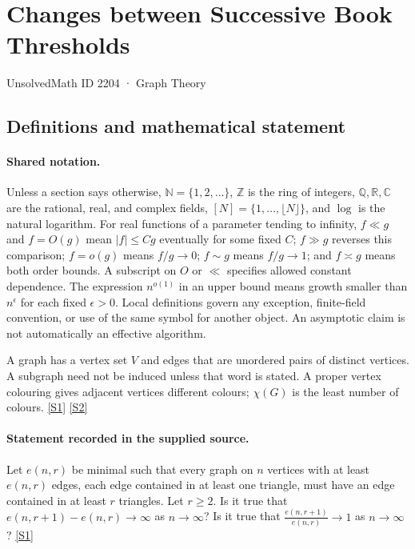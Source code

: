 \documentclass[11pt,a4paper]{article}
\newcommand{\N}{\mathbb{N}}
\newcommand{\Z}{\mathbb{Z}}
\newcommand{\Q}{\mathbb{Q}}
\newcommand{\R}{\mathbb{R}}
\newcommand{\C}{\mathbb{C}}
\newcommand{\sref}[2]{\hyperlink{source:#1:#2}{[S#2]}}
\begin{document}

\setcounter{section}{2203}

\section{Changes between Successive Book Thresholds}\label{2204}

{\small\sffamily UnsolvedMath ID 2204 · Graph Theory}

\subsection{Definitions and mathematical statement}

\paragraph{Shared notation.}Unless a section says otherwise, $\N=\{1,2,\ldots\}$,
$\Z$ is the ring of integers, $\Q,\R,\C$ are the rational, real, and complex
fields, $[N]=\{1,\ldots,\lfloor N\rfloor\}$, and $\log$ is the natural
logarithm. For real functions of a parameter tending to infinity,
$f\ll g$ and $f=O(g)$ mean $|f|\leq Cg$ eventually for some fixed $C$;
$f\gg g$ reverses this comparison; $f=o(g)$ means $f/g\to0$;
$f\sim g$ means $f/g\to1$; and $f\asymp g$ means both order bounds.
A subscript on $O$ or $\ll$ specifies allowed constant dependence.
The expression $n^{o(1)}$ in an upper bound means growth smaller than
$n^\epsilon$ for each fixed $\epsilon>0$. Local definitions govern any
exception, finite-field convention, or use of the same symbol for another
object. An asymptotic claim is not automatically an effective algorithm.



A graph has a vertex set $V$ and edges that are unordered pairs of distinct vertices. A subgraph need not be induced unless that word is stated. A proper vertex colouring gives adjacent vertices different colours; $\chi(G)$ is the least number of colours. \sref{2204}{1} \sref{2204}{2}

\paragraph{Statement recorded in the supplied source.}
Let $e(n,r)$ be minimal such that every graph on $n$ vertices with at least $e(n,r)$ edges, each edge contained in at least one triangle, must have an edge contained in at least $r$ triangles. Let $r\geq 2$. Is it true that $ e(n,r+1)-e(n,r)\to \infty $ as $n\to \infty$? Is it true that $ \frac{e(n,r+1)}{e(n,r)}\to 1 $ as $n\to \infty$? \sref{2204}{1}
\end{document}
